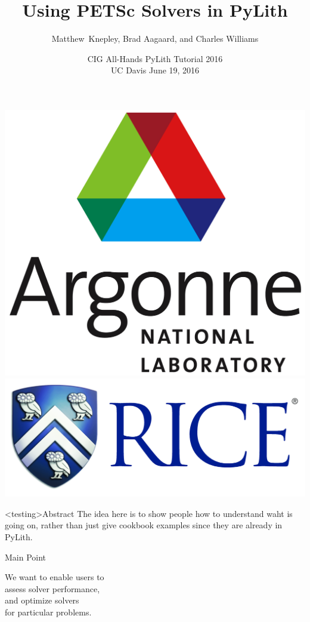 \documentclass[dvipsnames]{beamer}
\title[Solvers]{Using PETSc Solvers in PyLith}
\author[M.~Knepley]{Matthew~Knepley, Brad Aagaard, and Charles Williams}
\date[CIG16]{CIG All-Hands PyLith Tutorial 2016\\UC Davis \quad June 19, 2016}
\institute[Rice]{
  Computational and Applied Mathematics\\
  Rice University
}
\begin{document}
\begin{frame}
  \titlepage
  \begin{center}
  \includegraphics[scale=0.12]{figures/logos/anl-white-background-modern.jpg}\hspace{1.0in}
  \includegraphics[scale=0.10]{figures/logos/RiceLogo_TMCMYK300DPI.jpg}
  \end{center}
  \vskip0.4in
\end{frame}
%
\begin{frame}<testing>{Abstract}\small
The idea here is to show people how to understand waht is going on, rather than just give cookbook
examples since they are already in PyLith.
\end{frame}
%
\begin{frame}{Main Point}

\Huge
We want to enable users to\\
\bigskip
\pause
assess solver performance,\\
\bigskip
\pause
and optimize solvers\\
\qquad for particular problems.
\end{frame}
%
%
\end{document}
